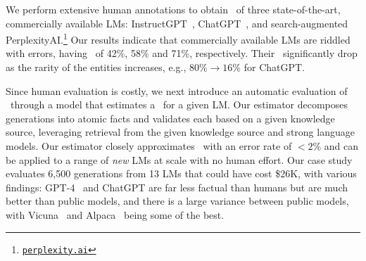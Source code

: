 %
We perform extensive human annotations to obtain \ourScores\ of three state-of-the-art, commercially available LMs: InstructGPT~\citep{ouyang2022training}, ChatGPT~\citep{chatgpt}, and search-augmented PerplexityAI.\footnote{\label{fn:ppl}\href{https://www.perplexity.ai/}{\texttt{perplexity.ai}}}
Our results indicate that commercially available LMs are riddled with errors, having \ourScores\ of 42\%, 58\% and 71\%, respectively.
Their \ourScores\ significantly drop as the rarity of the entities increases, e.g., $80\%\rightarrow16\%$ for ChatGPT.

Since human evaluation is costly, we next introduce an automatic evaluation of \ours\ through a model that estimates a \ourScore\ for a given LM.
Our estimator decomposes generations into atomic facts and validates each based on a given knowledge source, leveraging retrieval from the given knowledge source and strong language models.
Our estimator closely approximates \ours\ with an error rate of $<2\%$
%
and can be applied to a range of {\em new} LMs at scale with no human effort.
Our case study evaluates 6,500 generations from 13 LMs that could have cost \$26K, %
with various findings: %
GPT-4~\citep{OpenAI2023GPT4TR} and ChatGPT are far less factual than humans %
but are much better than public models,
and there is a large variance between public models, with %
Vicuna~\citep{vicuna2023} and Alpaca~\citep{alpaca} being some of the best.

